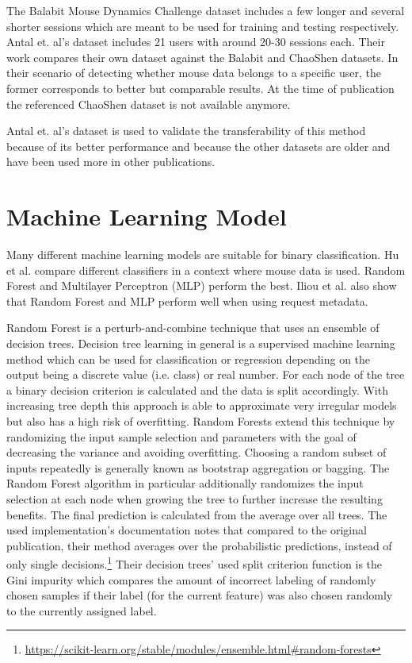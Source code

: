 \documentclass[
    fontsize=12pt,
    headings=small,
    parskip=half,           %
    bibliography=totoc,
    numbers=noenddot,       %
    open=any,               %
    final                   %
]{scrreprt}
\begin{document}
The Balabit Mouse Dynamics Challenge dataset \cite{BALABIT_CHALLENGE} includes a few longer and several shorter sessions which are meant to be used for training and testing respectively.
Antal et. al's dataset \cite{9111596} includes 21 users with around 20-30 sessions each. Their work compares their own dataset against the Balabit and ChaoShen datasets. In their scenario of detecting whether mouse data belongs to a specific user, the former corresponds to better but comparable results.
At the time of publication the referenced ChaoShen dataset is not available anymore.

Antal et. al's dataset is used to validate the transferability of this method because of its better performance and because the other datasets are older and have been used more in other publications.


\section{Machine Learning Model}

Many different machine learning models are suitable for binary classification. Hu et al. \cite{8275816} compare different classifiers in a context where mouse data is used. Random Forest and Multilayer Perceptron (MLP) perform the best.
Iliou et al. \cite{10.1145/3339252.3339267} also show that Random Forest and MLP perform well when using request metadata.

Random Forest\cite{Breiman2001} is a perturb-and-combine technique that uses an ensemble of decision trees. Decision tree learning in general is a supervised machine learning method which can be used for classification or regression depending on the output being a discrete value (i.e. class) or real number. For each node of the tree a binary decision criterion is calculated and the data is split accordingly. With increasing tree depth this approach is able to approximate very irregular models but also has a high risk of overfitting. Random Forests extend this technique by randomizing the input sample selection and parameters with the goal of decreasing the variance and avoiding overfitting. Choosing a random subset of inputs repeatedly is generally known as bootstrap  aggregation or bagging. The Random Forest algorithm in particular additionally randomizes the input selection at each node when growing the tree to further increase the resulting benefits. The final prediction is calculated from the average over all trees. The used implementation's documentation notes that compared to the original publication, their method averages over the probabilistic predictions, instead of only single decisions.\footnote{\url{https://scikit-learn.org/stable/modules/ensemble.html\#random-forests}} Their decision trees' used split criterion function is the Gini impurity which compares the amount of incorrect labeling of randomly chosen samples if their label (for the current feature) was also chosen randomly to the currently assigned label.
\end{document}
